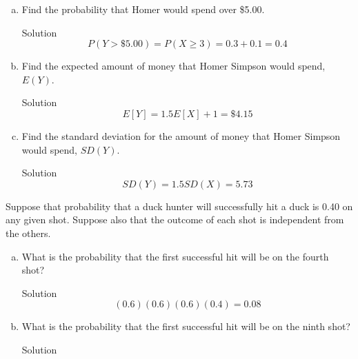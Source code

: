 \documentclass{article}
\begin{document}
\begin{spacing}{1.1}
\begin{homeworkProblem}
\begin{enumerate}[(a)]
\begin{homeworkSection}{Solution}
\[\begin{gathered}
  \sigma  = \sqrt {{{\left( {0(0.1) - 2.1} \right)}^2} + {{\left( {1(0.2) - 2.1} \right)}^2} + {{\left( {2(0.3) - 2.1} \right)}^2} + {{\left( {3(0.3) - 2.1} \right)}^2} + {{\left( {4(0.1) - 2.1} \right)}^2}}  \hfill \\
   = \sqrt {4.41 + 3.61 + 2.25 + 1.44 + 2.89}  = 3.82 \hfill \\ 
\end{gathered} \]
			\end{homeworkSection}
	Suppose each \emph{Flaming Moe} costs \$1.50, and there is a cover charge of \$1.00 at the door.  Let $Y$ denote the amount of money Homer Simpson spends at the bar Then $Y = 1.50 \cdot X+1.00$.
		\item Find the probability that Homer would spend over \$5.00.
			\begin{homeworkSection}{Solution}
				\[P(Y>\$5.00) = P(X \ge 3) = 0.3 +0.1 = 0.4\]
			\end{homeworkSection}
		\item  Find the expected amount of money that Homer Simpson would spend, $E(Y)$.
			\begin{homeworkSection}{Solution}
				\[ E[Y] = 1.5 E[X]+1 = \$4.15 \]
			\end{homeworkSection}
		\item  Find the standard deviation for the amount of money that Homer Simpson would spend, $SD(Y)$.
			\begin{homeworkSection}{Solution}
				\[ SD(Y) = 1.5SD(X) = 5.73 \]
			\end{homeworkSection}
	\end{enumerate}
\end{homeworkProblem}
\begin{homeworkProblem}
	Suppose that probability that a duck hunter will successfully hit a duck is 0.40 on any given shot.  Suppose also that the outcome of each shot is independent from the others.  
	\begin{enumerate}[(a)]
		\item What is the probability that the first successful hit will be on the fourth shot?
			\begin{homeworkSection}{Solution}
				\[(0.6)(0.6)(0.6)(0.4) = 0.08\]
			\end{homeworkSection}
		\item What is the probability that the first successful hit will be on the ninth shot?
			\begin{homeworkSection}{Solution}

\end{homeworkSection}
\end{enumerate}
\end{homeworkProblem}
\end{spacing}
\end{document}

